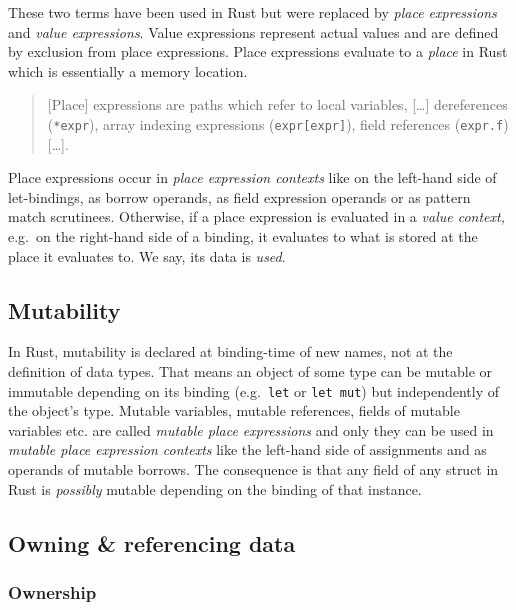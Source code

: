 These two terms have been used in Rust but were replaced by \emph{place
expressions} and \emph{value expressions}. Value expressions represent
actual values and are defined by exclusion from place expressions. Place
expressions evaluate to a \emph{place} in Rust which is essentially a
memory location.~\cite{rustref}

\begin{quote}
{[}Place{]} expressions are paths which refer to local variables,
{[}\ldots{]} dereferences (\passthrough{\lstinline!*expr!}), array
indexing expressions (\passthrough{\lstinline!expr[expr]!}), field
references (\passthrough{\lstinline!expr.f!}) {[}\ldots{]}. \\
\cite[section "Expressions"]{rustref}
\end{quote}

Place expressions occur in \emph{place expression contexts} like on the
left-hand side of let-bindings, as borrow operands, as field expression
operands or as pattern match scrutinees. Otherwise, if a place
expression is evaluated in a \emph{value context,} e.g.~on the
right-hand side of a binding, it evaluates to what is stored at the
place it evaluates to. We say, its data is \emph{used}.

\subsection{Mutability}

In Rust, mutability is declared at binding-time of new names, not at the
definition of data types. That means an object of some type can be
mutable or immutable depending on its binding
(e.g.~\passthrough{\lstinline!let!} or
\passthrough{\lstinline!let mut!}) but independently of the object's
type. Mutable variables, mutable references, fields of mutable variables
etc. are called \emph{mutable place expressions} and only they can be
used in \emph{mutable place expression contexts} like the left-hand side
of assignments and as operands of mutable borrows. The consequence is
that any field of any struct in Rust is \emph{possibly} mutable
depending on the binding of that instance.

\subsection{Owning \& referencing data}

\subsubsection{Ownership}

